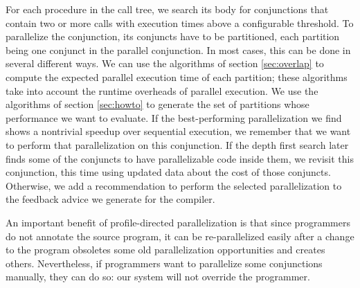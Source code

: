 For each procedure in the call tree,
we search its body for conjunctions that contain
two or more calls with execution times above a configurable threshold.
To parallelize the conjunction,
its conjuncts have to be partitioned,
each partition being one conjunct in the parallel conjunction.
In most cases, this can be done in several different ways.
We can use the algorithms of section \ref{sec:overlap}
to compute the expected parallel execution time of each partition;
these algorithms take into account the runtime overheads of parallel execution.
We use the algorithms of section \ref{sec:howto} to generate
the set of partitions whose performance we want to evaluate.
If the best-performing parallelization we find
shows a nontrivial speedup over sequential execution,
we remember that we want to perform that parallelization on this conjunction.
If the depth first search later finds
some of the conjuncts to have parallelizable code inside them,
we revisit this conjunction,
this time using updated data about the cost of those conjuncts.
Otherwise,
we add a recommendation to perform the selected parallelization
to the feedback advice we generate for the compiler.

An important benefit of profile-directed parallelization is that
since programmers do not annotate the source program,
it can be re-parallelized easily after a change to the program
obsoletes some old parallelization opportunities and creates others.
Nevertheless, if programmers want to parallelize some conjunctions manually,
they can do so: our system will not override the programmer.


